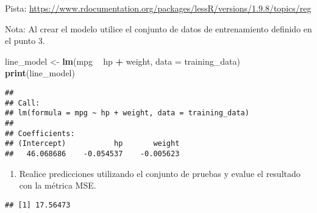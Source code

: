 \documentclass[]{article}
\newenvironment{Shaded}{\begin{snugshade}}{\end{snugshade}}
\newcommand{\DataTypeTok}[1]{\textcolor[rgb]{0.13,0.29,0.53}{#1}}
\newcommand{\KeywordTok}[1]{\textcolor[rgb]{0.13,0.29,0.53}{\textbf{#1}}}
\newcommand{\NormalTok}[1]{#1}
\newcommand{\OperatorTok}[1]{\textcolor[rgb]{0.81,0.36,0.00}{\textbf{#1}}}
\newcommand{\StringTok}[1]{\textcolor[rgb]{0.31,0.60,0.02}{#1}}
\providecommand{\tightlist}{%
  \setlength{\itemsep}{0pt}\setlength{\parskip}{0pt}}
\begin{document}
Pista:
\url{https://www.rdocumentation.org/packages/lessR/versions/1.9.8/topics/reg}

Nota: Al crear el modelo utilice el conjunto de datos de entrenamiento
definido en el punto 3.

\begin{Shaded}
\begin{Highlighting}[]
\NormalTok{  line_model <-}\StringTok{ }\KeywordTok{lm}\NormalTok{(mpg }\OperatorTok{~}\StringTok{ }\NormalTok{hp }\OperatorTok{+}\StringTok{ }\NormalTok{weight, }\DataTypeTok{data =}\NormalTok{ training_data)}
  \KeywordTok{print}\NormalTok{(line_model)}
\end{Highlighting}
\end{Shaded}

\begin{verbatim}
## 
## Call:
## lm(formula = mpg ~ hp + weight, data = training_data)
## 
## Coefficients:
## (Intercept)           hp       weight  
##   46.068686    -0.054537    -0.005623
\end{verbatim}

\begin{Shaded}
\end{Shaded}

\begin{enumerate}
\def\labelenumi{\arabic{enumi}.}
\setcounter{enumi}{4}
\tightlist
\item
  Realice predicciones utilizando el conjunto de pruebas y evalue el
  resultado con la métrica MSE.
\end{enumerate}

\begin{Shaded}
\end{Shaded}

\begin{verbatim}
## [1] 17.56473
\end{verbatim}
\end{document}
